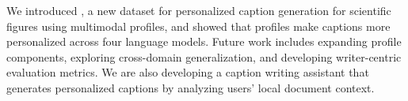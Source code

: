 

We introduced \dataset, a new dataset for personalized caption generation for scientific figures
using multimodal profiles, and showed that profiles make captions more personalized across four language models. 
Future work includes expanding profile components, exploring cross-domain generalization, and developing writer-centric evaluation metrics.
We are also developing a caption writing assistant that generates personalized captions by analyzing users' local document context.

